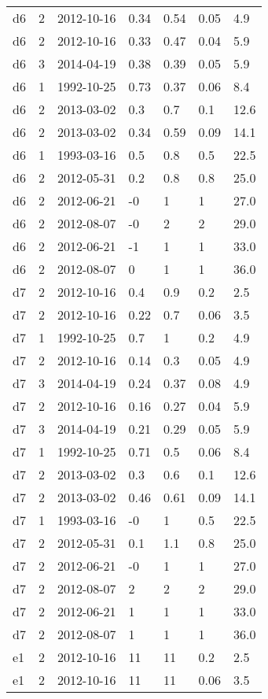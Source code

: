 \begin{table*}[htp]
\begin{tabular}{llll}
d6 & 2 & 2012-10-16 & 0.34 & 0.54 & 0.05 & 4.9 \\
d6 & 2 & 2012-10-16 & 0.33 & 0.47 & 0.04 & 5.9 \\
d6 & 3 & 2014-04-19 & 0.38 & 0.39 & 0.05 & 5.9 \\
d6 & 1 & 1992-10-25 & 0.73 & 0.37 & 0.06 & 8.4 \\
d6 & 2 & 2013-03-02 & 0.3 & 0.7 & 0.1 & 12.6 \\
d6 & 2 & 2013-03-02 & 0.34 & 0.59 & 0.09 & 14.1 \\
d6 & 1 & 1993-03-16 & 0.5 & 0.8 & 0.5 & 22.5 \\
d6 & 2 & 2012-05-31 & 0.2 & 0.8 & 0.8 & 25.0 \\
d6 & 2 & 2012-06-21 & -0 & 1 & 1 & 27.0 \\
d6 & 2 & 2012-08-07 & -0 & 2 & 2 & 29.0 \\
d6 & 2 & 2012-06-21 & -1 & 1 & 1 & 33.0 \\
d6 & 2 & 2012-08-07 & 0 & 1 & 1 & 36.0 \\
d7 & 2 & 2012-10-16 & 0.4 & 0.9 & 0.2 & 2.5 \\
d7 & 2 & 2012-10-16 & 0.22 & 0.7 & 0.06 & 3.5 \\
d7 & 1 & 1992-10-25 & 0.7 & 1 & 0.2 & 4.9 \\
d7 & 2 & 2012-10-16 & 0.14 & 0.3 & 0.05 & 4.9 \\
d7 & 3 & 2014-04-19 & 0.24 & 0.37 & 0.08 & 4.9 \\
d7 & 2 & 2012-10-16 & 0.16 & 0.27 & 0.04 & 5.9 \\
d7 & 3 & 2014-04-19 & 0.21 & 0.29 & 0.05 & 5.9 \\
d7 & 1 & 1992-10-25 & 0.71 & 0.5 & 0.06 & 8.4 \\
d7 & 2 & 2013-03-02 & 0.3 & 0.6 & 0.1 & 12.6 \\
d7 & 2 & 2013-03-02 & 0.46 & 0.61 & 0.09 & 14.1 \\
d7 & 1 & 1993-03-16 & -0 & 1 & 0.5 & 22.5 \\
d7 & 2 & 2012-05-31 & 0.1 & 1.1 & 0.8 & 25.0 \\
d7 & 2 & 2012-06-21 & -0 & 1 & 1 & 27.0 \\
d7 & 2 & 2012-08-07 & 2 & 2 & 2 & 29.0 \\
d7 & 2 & 2012-06-21 & 1 & 1 & 1 & 33.0 \\
d7 & 2 & 2012-08-07 & 1 & 1 & 1 & 36.0 \\
e1 & 2 & 2012-10-16 & 11 & 11 & 0.2 & 2.5 \\
e1 & 2 & 2012-10-16 & 11 & 11 & 0.06 & 3.5 \\

\end{tabular}
\end{table*}
